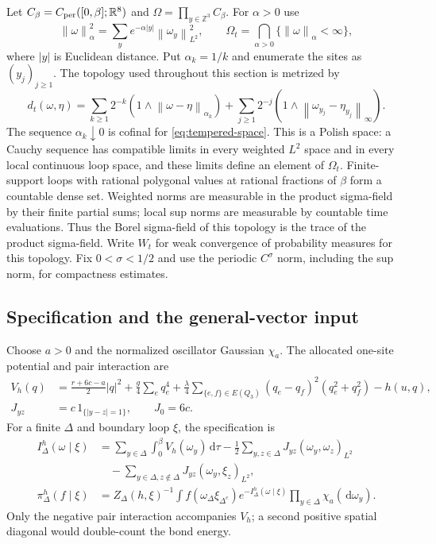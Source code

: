 \documentclass[11pt]{article}
\numberwithin{equation}{section}
\theoremstyle{definition}
\newcommand{\R}{\mathbb R}
\newcommand{\Z}{\mathbb Z}
\newcommand{\dd}{\,\mathrm d}
\newcommand{\norm}[1]{\left\lVert#1\right\rVert}
\begin{document}
Let $C_\beta=C_{\rm per}([0,\beta];\R^8)$ and
$\Omega=\prod_{y\in\Z^3}C_\beta$.  For $\alpha>0$ use
\begin{equation}
 \norm{\omega}_\alpha^2=\sum_y e^{-\alpha|y|}\norm{\omega_y}_{L^2}^2,
 \qquad \Omega_t=\bigcap_{\alpha>0}\{\norm{\omega}_\alpha<\infty\},
 \label{eq:tempered-space}
\end{equation}
where $|y|$ is Euclidean distance.  Put $\alpha_k=1/k$ and enumerate the
sites as $(y_j)_{j\geq1}$.  The topology used throughout this section is
metrized by
\begin{equation}
 d_t(\omega,\eta)=\sum_{k\geq1}2^{-k}
 (1\wedge\norm{\omega-\eta}_{\alpha_k})
 +\sum_{j\geq1}2^{-j}(1\wedge\norm{\omega_{y_j}-\eta_{y_j}}_\infty).
 \label{eq:tempered-metric}
\end{equation}
The sequence $\alpha_k\downarrow0$ is cofinal for
\eqref{eq:tempered-space}.  This is a Polish space: a Cauchy sequence has
compatible limits in every weighted $L^2$ space and in every local continuous
loop space, and these limits define an element of $\Omega_t$.  Finite-support
loops with rational polygonal values at rational fractions of $\beta$ form
a countable dense set.  Weighted norms are measurable in the product
sigma-field by their finite partial sums; local sup norms are measurable by
countable time evaluations.  Thus the Borel sigma-field of this topology is
the trace of the product sigma-field.  Write $W_t$ for weak convergence of
probability measures for this topology.  Fix $0<\sigma<1/2$ and use the
periodic $C^\sigma$ norm, including the sup norm, for compactness estimates.

\subsection{Specification and the general-vector input}
\label{sec:dlr-specification}

Choose $a>0$ and the normalized oscillator Gaussian $\chi_a$.  The allocated
one-site potential and pair interaction are
\begin{align}
 V_h(q)&=\frac{r+6c-a}{2}|q|^2+\frac g4\sum_e q_e^4
 +\frac\lambda4\sum_{\{e,f\}\in E(Q_3)}(q_e-q_f)^2(q_e^2+q_f^2)-h(u,q),\\
 J_{yz}&=c\,1_{\{|y-z|=1\}},\qquad J_0=6c.
\end{align}
For a finite $\Delta$ and boundary loop $\xi$, the specification is
\begin{align}
 I_\Delta^h(\omega\mid\xi)
 &=\sum_{y\in\Delta}\int_0^\beta V_h(\omega_y)\dd\tau
 -\frac12\sum_{y,z\in\Delta}J_{yz}(\omega_y,\omega_z)_{L^2}\nonumber\\
 &\quad-\sum_{y\in\Delta,z\notin\Delta}J_{yz}(\omega_y,\xi_z)_{L^2},\\
 \pi_\Delta^h(f\mid\xi)&=Z_\Delta(h,\xi)^{-1}
 \int f(\omega_\Delta\xi_{\Delta^c})e^{-I_\Delta^h(\omega\mid\xi)}
 \prod_{y\in\Delta}\chi_a(\dd\omega_y).
 \label{eq:specification}
\end{align}
Only the negative pair interaction accompanies $V_h$; a second positive spatial
diagonal would double-count the bond energy.
\end{document}
